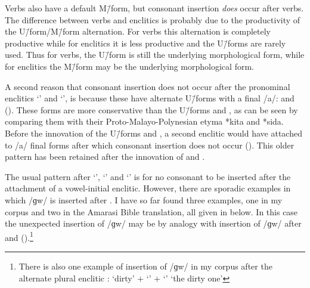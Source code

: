 Verbs also have a default M\=/form,
but consonant insertion \emph{does} occur after verbs.
The difference between verbs and enclitics is probably
due to the productivity of the U\=/form/M\=/form alternation.
For verbs this alternation is completely productive
while for enclitics it is less productive
and the U\=/forms are rarely used.
Thus for verbs, the U\=/form is still the underlying
morphological form, while for enclitics the M\=/form
may be the underlying morphological form.

A second reason that consonant insertion does not
occur after the pronominal enclitics  `{\kiit}' and  `{\siin}',
is because these have alternate U\=/forms
with a final /a/:  and  ().
These forms are more conservative than the U\=/forms  and ,
as can be seen by comparing them with their Proto-Malayo-Polynesian etyma *kita and *sida.
Before the innovation of the U\=/forms  and ,
a second enclitic would have attached to /a/ final forms
after which consonant insertion does not occur ().
This older pattern has been retained after
the innovation of  and .

The usual pattern after  `{\ein}',
 `{\kiit}' and  `{\siin}' is
for no consonant to be inserted after the attachment of a vowel-initial enclitic.
However, there are sporadic examples in which /ɡw/ is inserted after .
I have so far found three examples, one in my corpus
and two in the Amarasi Bible translation,
all given in  below.
In this case the unexpected insertion
of /ɡw/ may be by analogy with insertion of /ɡw/
after  and  ().\footnote{
		There is also one example of insertion of /ɡw/ in my corpus
		after the alternate plural enclitic :
		 `dirty' +  `{\ein}' +  `{\ii}' {\ra}
		 `the dirty one'}

\begin{exe}
\end{exe}

